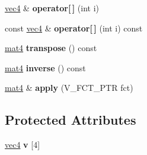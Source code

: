 \begin{DoxyCompactItemize}
\item 
\hypertarget{classmat4_a856496a5770f27f58e19064d27a05722}{
\hyperlink{classvec4}{vec4} \& {\bfseries operator\mbox{[}$\,$\mbox{]}} (int i)}
\label{classmat4_a856496a5770f27f58e19064d27a05722}

\item 
\hypertarget{classmat4_a58f5742e4149bf369ea0d1d494eb3d98}{
const \hyperlink{classvec4}{vec4} \& {\bfseries operator\mbox{[}$\,$\mbox{]}} (int i) const }
\label{classmat4_a58f5742e4149bf369ea0d1d494eb3d98}

\item 
\hypertarget{classmat4_aab816366c2233c95eac70b2eab11e8e2}{
\hyperlink{classmat4}{mat4} {\bfseries transpose} () const }
\label{classmat4_aab816366c2233c95eac70b2eab11e8e2}

\item 
\hypertarget{classmat4_a90efa7f6bcd321d1433629c8e6c09af3}{
\hyperlink{classmat4}{mat4} {\bfseries inverse} () const }
\label{classmat4_a90efa7f6bcd321d1433629c8e6c09af3}

\item 
\hypertarget{classmat4_a2a80b0b0d4ed30044260e4d0c9074caf}{
\hyperlink{classmat4}{mat4} \& {\bfseries apply} (V\_\-FCT\_\-PTR fct)}
\label{classmat4_a2a80b0b0d4ed30044260e4d0c9074caf}

\end{DoxyCompactItemize}
\subsection*{Protected Attributes}
\begin{DoxyCompactItemize}
\item 
\hypertarget{classmat4_a2ce0e685a8fdc40580a68ce01d8c28e9}{
\hyperlink{classvec4}{vec4} {\bfseries v} \mbox{[}4\mbox{]}}
\label{classmat4_a2ce0e685a8fdc40580a68ce01d8c28e9}

\end{DoxyCompactItemize}
